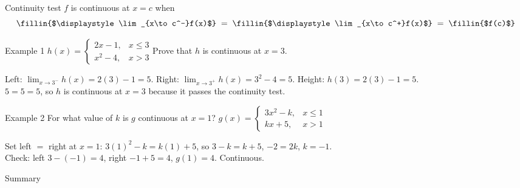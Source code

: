 \begin{nrow}{Continuity test}
$f$ is continuous at $x=c$ when
\[\fillin{$\displaystyle\lim_{x\to c^-}f(x)$}\;=\;\fillin{$\displaystyle\lim_{x\to c^+}f(x)$}\;=\;\fillin{$f(c)$}\]
\end{nrow}
\begin{nrow}{Example 1}
$h(x)=\begin{cases}2x-1, & x\le3\\ x^2-4, & x>3\end{cases}$\qquad Prove that $h$ is continuous at $x=3$.
\begin{workspace}[2.6cm]
Left: $\lim_{x\to3^-}h(x)=2(3)-1=5$. \;Right: $\lim_{x\to3^+}h(x)=3^2-4=5$. \;Height: $h(3)=2(3)-1=5$.\\
$5=5=5$, so $h$ is continuous at $x=3$ because it passes the continuity test.
\end{workspace}
\end{nrow}
\begin{nrow}{Example 2}
For what value of $k$ is $g$ continuous at $x=1$? \qquad $g(x)=\begin{cases}3x^2-k, & x\le1\\ kx+5, & x>1\end{cases}$
\begin{workspace}[2.8cm]
Set left $=$ right at $x=1$: $3(1)^2-k=k(1)+5$, so $3-k=k+5$, $-2=2k$, $k=-1$.\\
Check: left $3-(-1)=4$, right $-1+5=4$, $g(1)=4$. Continuous.
\end{workspace}
\end{nrow}
\begin{nrow}{Summary}
\else\vspace{2.4cm}\fi
\end{nrow}

